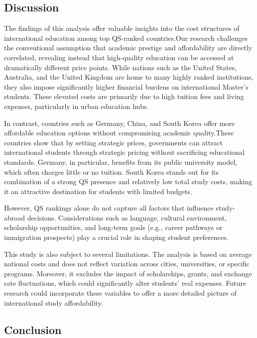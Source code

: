 \documentclass[
  letterpaper,
  DIV=11,
  numbers=noendperiod]{scrartcl}
\begin{document}
\subsection{Discussion}\label{discussion}

The findings of this analysis offer valuable insights into the cost
structures of international education among top QS-ranked countries.Our
research challenges the conventional assumption that academic prestige
and affordability are directly correlated, revealing instead that
high-quality education can be accessed at dramatically different price
points. While nations such as the United States, Australia, and the
United Kingdom are home to many highly ranked institutions, they also
impose significantly higher financial burdens on international Master's
students. These elevated costs are primarily due to high tuition fees
and living expenses, particularly in urban education hubs.

In contrast, countries such as Germany, China, and South Korea offer
more affordable education options without compromising academic
quality.These countries show that by setting strategic prices,
governments can attract international students through strategic pricing
without sacrificing educational standards. Germany, in particular,
benefits from its public university model, which often charges little or
no tuition. South Korea stands out for its combination of a strong QS
presence and relatively low total study costs, making it an attractive
destination for students with limited budgets.

However, QS rankings alone do not capture all factors that influence
study-abroad decisions. Considerations such as language, cultural
environment, scholarship opportunities, and long-term goals (e.g.,
career pathways or immigration prospects) play a crucial role in shaping
student preferences.

This study is also subject to several limitations. The analysis is based
on average national costs and does not reflect variation across cities,
universities, or specific programs. Moreover, it excludes the impact of
scholarships, grants, and exchange rate fluctuations, which could
significantly alter students' real expenses. Future research could
incorporate these variables to offer a more detailed picture of
international study affordability.

\subsection{Conclusion}\label{conclusion}
\end{document}
